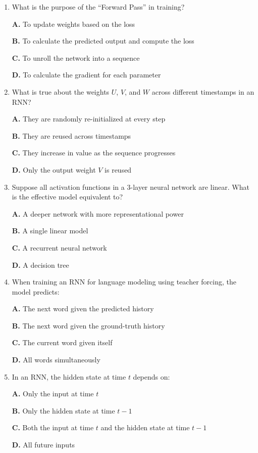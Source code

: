 \documentclass[11pt]{article}
\begin{document}
\begin{enumerate}[label=Q\arabic*., leftmargin=*]
\item What is the purpose of the ``Forward Pass'' in training?

\textbf{A.} To update weights based on the loss

\textbf{B.} To calculate the predicted output and compute the loss

\textbf{C.} To unroll the network into a sequence

\textbf{D.} To calculate the gradient for each parameter

\item What is true about the weights $U$, $V$, and $W$ across different timestamps in an RNN?

\textbf{A.} They are randomly re-initialized at every step

\textbf{B.} They are reused across timestamps

\textbf{C.} They increase in value as the sequence progresses

\textbf{D.} Only the output weight $V$ is reused

\item Suppose all activation functions in a 3-layer neural network are linear. What is the effective model equivalent to?

\textbf{A.} A deeper network with more representational power

\textbf{B.} A single linear model

\textbf{C.} A recurrent neural network

\textbf{D.} A decision tree

\item When training an RNN for language modeling using teacher forcing, the model predicts:

\textbf{A.} The next word given the predicted history

\textbf{B.} The next word given the ground-truth history

\textbf{C.} The current word given itself

\textbf{D.} All words simultaneously

\item In an RNN, the hidden state at time $t$ depends on:

\textbf{A.} Only the input at time $t$

\textbf{B.} Only the hidden state at time $t-1$

\textbf{C.} Both the input at time $t$ and the hidden state at time $t-1$

\textbf{D.} All future inputs


\end{enumerate}
\end{document}
